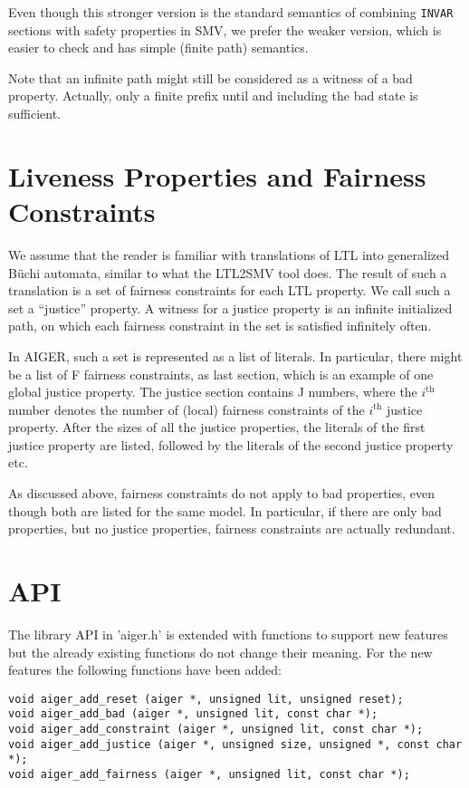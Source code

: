 \documentclass{llncs}
\begin{document}
Even though this stronger version is the standard semantics of combining
\texttt{INVAR} sections with safety properties in SMV, we prefer the weaker
version, which is easier to check and has simple (finite path) semantics.

Note that an infinite path might still be considered as a witness of a bad
property.  Actually, only a finite prefix until and including the bad state
is sufficient.

\section{Liveness Properties and Fairness Constraints}

We assume that the reader is familiar with translations of LTL into
generalized B\"{u}chi automata, similar to what the LTL2SMV tool does.
The result of such a translation is a set of fairness constraints for each
LTL property.  We call such a set a ``justice'' property.  A witness for a
justice property is an infinite initialized path, on which each
fairness constraint in the set is satisfied infinitely often.

In AIGER, such a set is represented as a list of literals.  In particular,
there might be a list of F fairness constraints, as last section, which is an
example of one global justice property.  The justice section contains J
numbers, where the $i^{\mathrm{th}}$ number denotes the number of (local)
fairness constraints of the $i^\mathrm{th}$ justice property.  After the sizes of all
the justice properties, the literals of the first justice property are
listed, followed by the literals of the second justice property etc.

As discussed above, fairness constraints do not apply to bad properties,
even
though both are listed for the same model.  In particular, if there are only
bad properties, but no justice properties, fairness constraints are actually
redundant.

\section{API}

The library API in 'aiger.h' is extended with functions to support new
features but the already existing functions do not change their meaning.
For the new features the following functions have been added:
{\small
\begin{verbatim}
void aiger_add_reset (aiger *, unsigned lit, unsigned reset);
void aiger_add_bad (aiger *, unsigned lit, const char *);
void aiger_add_constraint (aiger *, unsigned lit, const char *);
void aiger_add_justice (aiger *, unsigned size, unsigned *, const char *);
void aiger_add_fairness (aiger *, unsigned lit, const char *);
\end{verbatim}}
\end{document}
